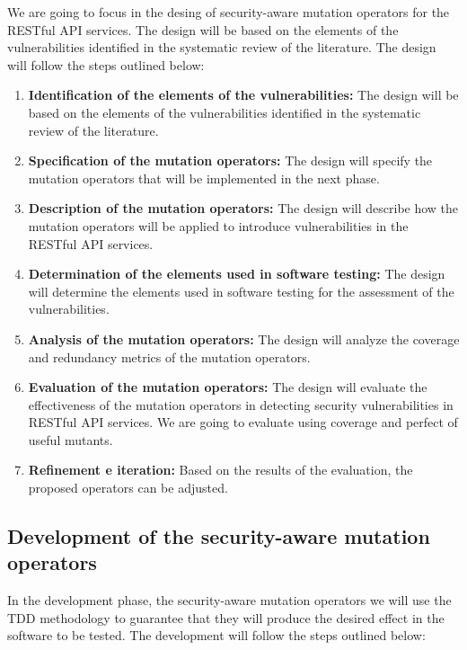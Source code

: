 We are going to focus in the desing of security-aware mutation operators for the RESTful API services. The design will be based on the elements of the vulnerabilities identified in the systematic review of the literature. The design will follow the steps outlined below:

\begin{enumerate}
  \item \textbf{Identification of the elements of the vulnerabilities:} The design will be based on the elements of the vulnerabilities identified in the systematic review of the literature.
  \item \textbf{Specification of the mutation operators:} The design will specify the mutation operators that will be implemented in the next phase.
  \item \textbf{Description of the mutation operators:} The design will describe how the mutation operators will be applied to introduce vulnerabilities in the RESTful API services.
  \item \textbf{Determination of the elements used in software testing:} The design will determine the elements used in software testing for the assessment of the vulnerabilities.
  \item \textbf{Analysis of the mutation operators:} The design will analyze the coverage and redundancy metrics of the mutation operators.
  \item \textbf{Evaluation of the mutation operators:} The design will evaluate the effectiveness of the mutation operators in detecting security vulnerabilities in RESTful API services. We are going to evaluate using coverage and perfect of useful mutants.
  \item \textbf{Refinement e iteration:} Based on the results of the evaluation, the proposed operators can be adjusted.
\end{enumerate}

\subsection{Development of the security-aware mutation operators}

In the development phase, the security-aware mutation operators we will use the TDD methodology\cite{williams2003test} to guarantee that they will produce the desired effect in the software to be tested. The development will follow the steps outlined below:

